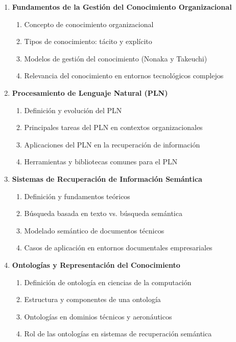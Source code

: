\begin{enumerate}
  \item \textbf{Fundamentos de la Gestión del Conocimiento Organizacional}
  \begin{enumerate}
    \item Concepto de conocimiento organizacional
    \item Tipos de conocimiento: tácito y explícito
    \item Modelos de gestión del conocimiento (Nonaka y Takeuchi)
    \item Relevancia del conocimiento en entornos tecnológicos complejos
  \end{enumerate}

  \item \textbf{Procesamiento de Lenguaje Natural (PLN)}
  \begin{enumerate}
    \item Definición y evolución del PLN
    \item Principales tareas del PLN en contextos organizacionales
    \item Aplicaciones del PLN en la recuperación de información
    \item Herramientas y bibliotecas comunes para el PLN
  \end{enumerate}

  \item \textbf{Sistemas de Recuperación de Información Semántica}
  \begin{enumerate}
    \item Definición y fundamentos teóricos
    \item Búsqueda basada en texto vs. búsqueda semántica
    \item Modelado semántico de documentos técnicos
    \item Casos de aplicación en entornos documentales empresariales
  \end{enumerate}

  \item \textbf{Ontologías y Representación del Conocimiento}
  \begin{enumerate}
    \item Definición de ontología en ciencias de la computación
    \item Estructura y componentes de una ontología
    \item Ontologías en dominios técnicos y aeronáuticos
    \item Rol de las ontologías en sistemas de recuperación semántica
  \end{enumerate}


\end{enumerate}
